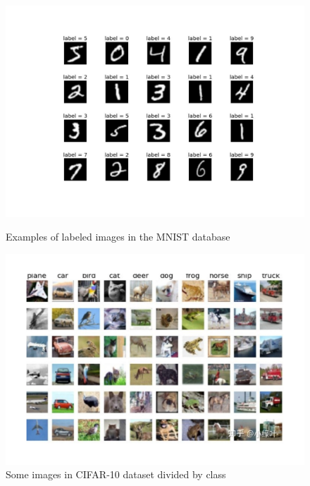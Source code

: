 \documentclass[12pt,a4paper]{report}
\theoremstyle{definition}
\begin{document}
\begin{figure}[h]
\begin{minipage}[b]{0.41\linewidth}
\centering
\includegraphics[trim={5.5cm 3.6cm 5cm 3cm}, clip, width=\textwidth]{./Images/MNIST-dataset.pdf}
\caption{Examples of labeled images in the MNIST database}
\label{fig:MNIST dataset}
\end{minipage}
\hspace{0.5cm}
\begin{minipage}[b]{0.54\linewidth}
\centering
\includegraphics[trim={1.5cm 3.3cm 1.6cm 1cm}, clip, width=\textwidth]{./Images/CIFAR_10_3.pdf}
\caption{Some images in CIFAR-10 dataset divided by class}
\label{fig:CIFAR dataset}
\end{minipage}
\end{figure}
\end{document}
